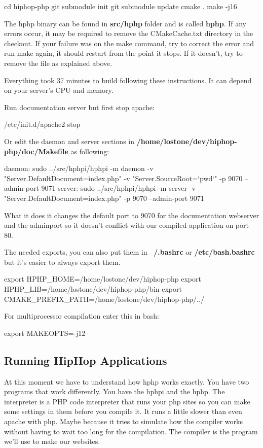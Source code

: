 \begin{codelisting}
cd hiphop-php
git submodule init
git submodule update
cmake .
make -j16
\end{codelisting}
The \gls{hphp} binary can be found in \textbf{src/hphp} folder and is called \textbf{hphp}.
If any errors occur, it may be required to remove the CMakeCache.txt directory in the checkout. If your failure was on the make command, try to correct the error and run make again, it should restart
from the point it stops. If it doesn't, try to remove the file as explained above.

Everything took 37 minutes to build following these instructions. It can depend on your server's CPU and memory.

Run documentation server but first stop \gls{apache}:
\begin{codelisting}
	/etc/init.d/apache2 stop
\end{codelisting}
Or edit the daemon and server sections in \textbf{/home/lostone/dev/hiphop-php/doc/Makefile} as following:
\begin{codelisting}
daemon:
sudo ../src/hphpi/hphpi -m daemon -v
"Server.DefaultDocument=index.php" -v "Server.SourceRoot=`pwd`" -p
9070 --admin-port 9071
server:
sudo ../src/hphpi/hphpi -m server -v
"Server.DefaultDocument=index.php" -p 9070 --admin-port 9071
\end{codelisting}
What it does it changes the default port to 9070 for the documentation webserver and the adminport so it doesn't conflict with our compiled application on port 80.

The needed exports, you can also put them in  \textbf{~/.bashrc} or \textbf{/etc/bash.bashrc} but it's easier to always export them.
\begin{codelisting}
export HPHP_HOME=/home/lostone/dev/hiphop-php
export HPHP_LIB=/home/lostone/dev/hiphop-php/bin
export CMAKE_PREFIX_PATH=/home/lostone/dev/hiphop-php/../
\end{codelisting}
For multiprocessor compilation enter this in bash:
\begin{codelisting}
export MAKEOPTS=-j12
\end{codelisting}

\subsection{Running HipHop Applications}
At this moment we have to understand how \gls{hphp} works exactly. You have two programs that work differently. You have the \gls{hphpi} and the \gls{hphp}. 
The interpreter is a PHP code interpreter that runs your \gls{php} sites so you can make some settings in them before you compile it. 
It runs a little slower than even \gls{apache} with \gls{php}. Maybe because it tries to simulate how the compiler works without having to wait too long for the compilation.
The compiler is the program we'll use to make our websites.

